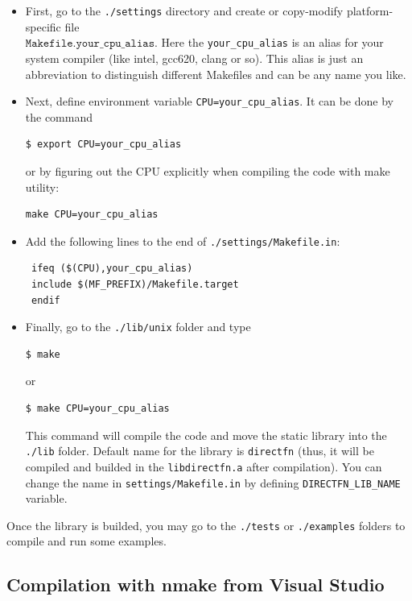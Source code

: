 \documentclass[a4wide,11pt]{article}
\renewcommand{\[}{\begin{equation}}
\renewcommand{\]}{\end{equation}}
\renewcommand{\{}{\begin{eqnarray}}
\renewcommand{\}}{\end{eqnarray}}
\begin{document}
\begin{itemize}
\item First, go to the \texttt{./settings} directory and create or copy-modify platform-specific file\\  $\texttt{Makefile.your\_cpu\_alias}$.
Here the \texttt{your\_cpu\_alias} is an alias for your system compiler (like intel, gcc620, clang or so). This alias is
just an abbreviation to distinguish different Makefiles and can be any name you like.

\item Next, define environment variable \texttt{CPU=your\_cpu\_alias}. It can be done by the command
\begin{verbatim}
$ export CPU=your_cpu_alias
\end{verbatim}
or by figuring out the CPU explicitly when compiling the code with make utility:
\begin{verbatim}
make CPU=your_cpu_alias
\end{verbatim}

\item  Add  the following lines to the end of \texttt{./settings/Makefile.in}: 
 \begin{verbatim}
 ifeq ($(CPU),your_cpu_alias)
 include $(MF_PREFIX)/Makefile.target
 endif
 \end{verbatim}
 
 \item Finally, go to the \texttt{./lib/unix} folder and type 
 \begin{verbatim}
$ make
\end{verbatim}
 
or 
\begin{verbatim}
$ make CPU=your_cpu_alias
  \end{verbatim}
 This command will compile the code and move the static library into the \texttt{./lib} folder.
 Default name for the library is \texttt{directfn} (thus, it will be compiled and 
 builded in the \texttt{libdirectfn.a} after compilation).
 You can change the name in \texttt{settings/Makefile.in} by defining
 \texttt{DIRECTFN\_LIB\_NAME} variable.
\end{itemize}
Once the library is builded, you may go to the \texttt{./tests} or \texttt{./examples} folders
to compile and run some examples.
\subsection*{Compilation with nmake from Visual Studio}
\label{nmake}
\end{document}
